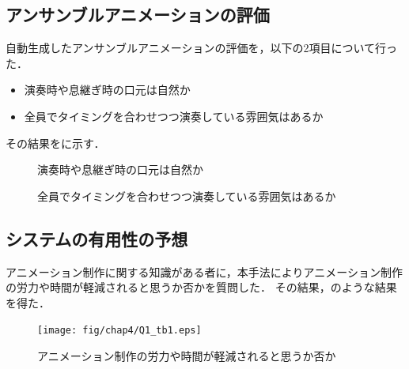 \subsection{アンサンブルアニメーションの評価}
自動生成したアンサンブルアニメーションの評価を，以下の2項目について行った．
\begin{itemize}
	\item 演奏時や息継ぎ時の口元は自然か
	\item 全員でタイミングを合わせつつ演奏している雰囲気はあるか
\end{itemize}
その結果をに示す．
\begin{figure}[!h]
	\centering
	\hspace{2mm}
	\caption{演奏時や息継ぎ時の口元は自然か}
	\label{fig:Q3-1}
\end{figure}
\begin{figure}[!h]
	\centering
	\caption{全員でタイミングを合わせつつ演奏している雰囲気はあるか}
	\label{fig:Q3-2}
\end{figure}
\newpage
\subsection{システムの有用性の予想}
アニメーション制作に関する知識がある者に，本手法によりアニメーション制作の労力や時間が軽減されると思うか否かを質問した．
その結果，のような結果を得た．
\begin{figure}[!h]
	\centering
	\texttt{[image: fig/chap4/Q1\_tb1.eps]}
	\caption{アニメーション制作の労力や時間が軽減されると思うか否か}
	\label{fig:ans2}
\end{figure}